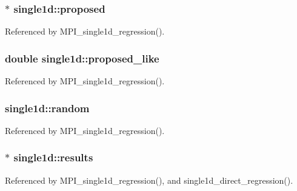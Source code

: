 \subsubsection[{\texorpdfstring{proposed}{proposed}}]{$\ast$ single1d\+::proposed}\hypertarget{structsingle1d_ae70a37637c7d83688bb73f317acc902b}{}\label{structsingle1d_ae70a37637c7d83688bb73f317acc902b}


Referenced by M\+P\+I\+\_\+single1d\+\_\+regression().

\subsubsection[{\texorpdfstring{proposed\+\_\+like}{proposed_like}}]{\setlength{\rightskip}{0pt plus 5cm}double single1d\+::proposed\+\_\+like}\hypertarget{structsingle1d_a76a0b0fefcd9fb6fb9593adbfb99cac5}{}\label{structsingle1d_a76a0b0fefcd9fb6fb9593adbfb99cac5}


Referenced by M\+P\+I\+\_\+single1d\+\_\+regression().

\subsubsection[{\texorpdfstring{random}{random}}]{ single1d\+::random}\hypertarget{structsingle1d_a1c0d7a1f68bb353fb706ed2b995ea177}{}\label{structsingle1d_a1c0d7a1f68bb353fb706ed2b995ea177}


Referenced by M\+P\+I\+\_\+single1d\+\_\+regression().

\subsubsection[{\texorpdfstring{results}{results}}]{$\ast$ single1d\+::results}\hypertarget{structsingle1d_a7ab4e0dbdaadda57be44987a63ad4e4d}{}\label{structsingle1d_a7ab4e0dbdaadda57be44987a63ad4e4d}


Referenced by M\+P\+I\+\_\+single1d\+\_\+regression(), and single1d\+\_\+direct\+\_\+regression().

